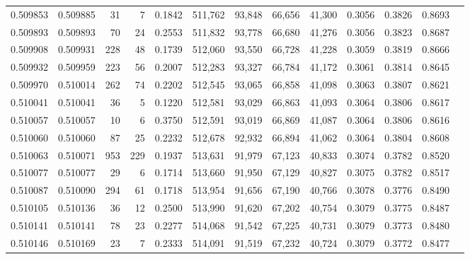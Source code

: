 \begin{tabular}{rrrrrrrrrrrrr}
0.509853 & 0.509885 &    31 &     7 &                                     0.1842 & 511,762 &  93,848 &  66,656 &  41,300 & 0.3056 & 0.3826 & 0.8693 \\
0.509893 & 0.509893 &    70 &    24 &                                     0.2553 & 511,832 &  93,778 &  66,680 &  41,276 & 0.3056 & 0.3823 & 0.8687 \\
0.509908 & 0.509931 &   228 &    48 &                                     0.1739 & 512,060 &  93,550 &  66,728 &  41,228 & 0.3059 & 0.3819 & 0.8666 \\
0.509932 & 0.509959 &   223 &    56 &                                     0.2007 & 512,283 &  93,327 &  66,784 &  41,172 & 0.3061 & 0.3814 & 0.8645 \\
0.509970 & 0.510014 &   262 &    74 &                                     0.2202 & 512,545 &  93,065 &  66,858 &  41,098 & 0.3063 & 0.3807 & 0.8621 \\
0.510041 & 0.510041 &    36 &     5 &                                     0.1220 & 512,581 &  93,029 &  66,863 &  41,093 & 0.3064 & 0.3806 & 0.8617 \\
0.510057 & 0.510057 &    10 &     6 &                                     0.3750 & 512,591 &  93,019 &  66,869 &  41,087 & 0.3064 & 0.3806 & 0.8616 \\
0.510060 & 0.510060 &    87 &    25 &                                     0.2232 & 512,678 &  92,932 &  66,894 &  41,062 & 0.3064 & 0.3804 & 0.8608 \\
0.510063 & 0.510071 &   953 &   229 &                                     0.1937 & 513,631 &  91,979 &  67,123 &  40,833 & 0.3074 & 0.3782 & 0.8520 \\
0.510077 & 0.510077 &    29 &     6 &                                     0.1714 & 513,660 &  91,950 &  67,129 &  40,827 & 0.3075 & 0.3782 & 0.8517 \\
0.510087 & 0.510090 &   294 &    61 &                                     0.1718 & 513,954 &  91,656 &  67,190 &  40,766 & 0.3078 & 0.3776 & 0.8490 \\
0.510105 & 0.510136 &    36 &    12 &                                     0.2500 & 513,990 &  91,620 &  67,202 &  40,754 & 0.3079 & 0.3775 & 0.8487 \\
0.510141 & 0.510141 &    78 &    23 &                                     0.2277 & 514,068 &  91,542 &  67,225 &  40,731 & 0.3079 & 0.3773 & 0.8480 \\
0.510146 & 0.510169 &    23 &     7 &                                     0.2333 & 514,091 &  91,519 &  67,232 &  40,724 & 0.3079 & 0.3772 & 0.8477 \\

\end{tabular}
